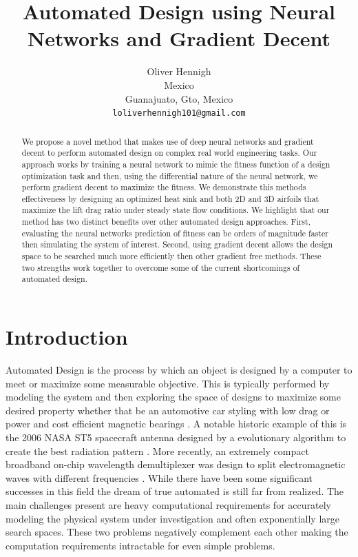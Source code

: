\documentclass{article} %
\title{Automated Design using Neural Networks and Gradient Decent}
\author{Oliver Hennigh \\
Mexico\\
Guanajuato, Gto, Mexico \\
\texttt{loliverhennigh101@gmail.com} \\
}
\begin{document}
\maketitle

\begin{abstract}

We propose a novel method that makes use of deep neural networks and gradient decent to perform automated design on complex real world engineering tasks. Our approach works by training a neural network to mimic the fitness function of a design optimization task and then, using the differential nature of the neural network, we perform gradient decent to maximize the fitness. We demonstrate this methods effectiveness by designing an optimized heat sink and both 2D and 3D airfoils that maximize the lift drag ratio under steady state flow conditions. We highlight that our method has two distinct benefits over other automated design approaches. First, evaluating the neural networks prediction of fitness can be orders of magnitude faster then simulating the system of interest. Second, using gradient decent allows the design space to be searched much more efficiently then other gradient free methods. These two strengths work together to overcome some of the current shortcomings of automated design.

\end{abstract}

\section{Introduction}

Automated Design is the process by which an object is designed by a computer to meet or maximize some measurable objective. This is typically performed by modeling the system and then exploring the space of designs to maximize some desired property whether that be an automotive car styling with low drag \cite{ando2010automotive} or power and cost efficient magnetic bearings \cite{dyck1996automated} . A notable historic example of this is the 2006 NASA ST5 spacecraft antenna designed by a evolutionary algorithm to create the best radiation pattern \cite{hornbyautomated}. More recently, an extremely compact broadband on-chip wavelength demultiplexer was design to split electromagnetic waves with different frequencies \cite{piggott2015inverse}. While there have been some significant successes in this field the dream of true automated is still far from realized. The main challenges present are heavy computational requirements for accurately modeling the physical system under investigation and often exponentially large search spaces. These two problems negatively complement each other making the computation requirements intractable for even simple problems.
\end{document}
